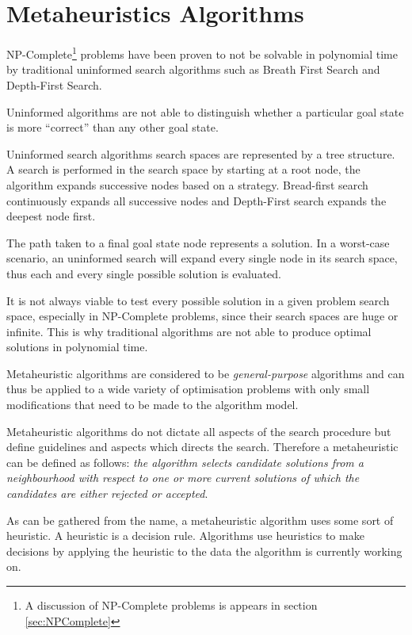 \section{Metaheuristics Algorithms}
NP-Complete\footnote{A discussion of NP-Complete problems is appears in section \ref{sec:NPComplete}} problems have been proven to not be solvable in polynomial time by traditional uninformed search algorithms such as Breath First Search and Depth-First Search\cite{AIModernApproach}. 

Uninformed algorithms are not able to distinguish whether a particular goal state is more ``correct'' than any other goal state\cite{AIModernApproach}.

Uninformed search algorithms search spaces are represented by a tree structure\cite{AIModernApproach}. A search is performed in the search space by starting at a root node, the algorithm expands successive nodes based on a strategy\cite{AIModernApproach}. Bread-first search continuously expands all successive nodes and Depth-First search expands the deepest node first\cite{AIModernApproach}.

The path taken to a final  goal state node represents a solution\cite{AIModernApproach}. In a worst-case scenario, an uninformed search will expand every single node in its search space, thus each and every single possible solution is evaluated\cite{AIModernApproach}.

It is not always viable to test every possible solution in a given problem search space, especially in NP-Complete problems, since their search spaces are huge or infinite. This is why traditional algorithms are not able to produce optimal solutions in polynomial time\cite{AIModernApproach}.

Metaheuristic algorithms are considered to be \emph{general-purpose} algorithms and can thus be applied to a wide variety of optimisation problems with only small modifications that need to be made to the algorithm model\cite{MetaGraph}.

Metaheuristic algorithms do not dictate all aspects of the search procedure but define guidelines and aspects which directs the search\cite{HandbookofMH}. Therefore a metaheuristic can be defined as follows: \emph{the algorithm selects candidate solutions from a neighbourhood with respect to one or more current solutions of which the candidates are either rejected or accepted}\cite{HandbookofMH}.

As can be gathered from the name, a metaheuristic algorithm uses some sort of heuristic. A heuristic is a decision rule. Algorithms use heuristics to make decisions by applying the heuristic to the data the algorithm is currently working on\cite{AIModernApproach,NatureInspiredMetaHeuristic}.

